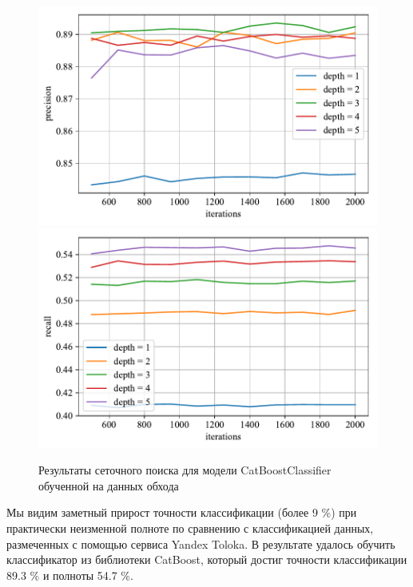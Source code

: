 \begin{figure}
    \centering
    \includegraphics{../images/model_factory_precision.pdf}
    \includegraphics{../images/model_factory_recall.pdf}
    \caption{Результаты сеточного поиска для модели CatBoostClassifier обученной на данных обхода}
    \label{fig:model_factory}
\end{figure}

Мы видим заметный прирост точности классификации (более 9 \%) при практически неизменной полноте по сравнению с классификацией данных, размеченных с помощью сервиса Yandex Toloka. В результате удалось обучить классификатор из библиотеки CatBoost, который достиг точности классификации 89.3 \% и полноты 54.7 \%.